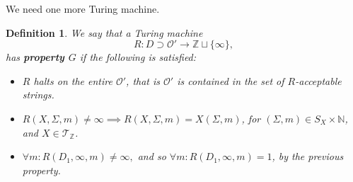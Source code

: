 \documentclass{amsart}  %
\numberwithin{equation}{section}
\newtheorem{definition}[equation]{Definition}
\theoremstyle{definition}
\theoremstyle{remark}
\begin{document}
{We need one more Turing machine.  
\begin{definition}
We say that a Turing machine 
\begin{equation*}
   R: D \supset \mathcal{O}'    \to  \mathbb{Z} \sqcup \{\infty\}, 
\end{equation*}
has 
\textbf{\emph{property $G$}} if the following is satisfied:
\begin{itemize}
   \item  $R$ halts on the entire $\mathcal{O}' $, that is $\mathcal{O}'$ is contained in the set of $R$-acceptable strings.
   \item  $R (X, \Sigma,m) \neq \infty \implies R (X,\Sigma,m) = X (\Sigma,m )$, for $(\Sigma,m) \in S _{X}  \times \mathbb{N} $, and $X \in \mathcal{T} _{\mathbb{Z}} $.
\item   
$\forall m: R (D_1, \infty, m)  \neq \infty,$
and so $\forall m: R (D_1, \infty,m) = 1$, by the previous property.
\end{itemize}
\end{definition}
%
%
%
%
%
%
}
\end{document}
